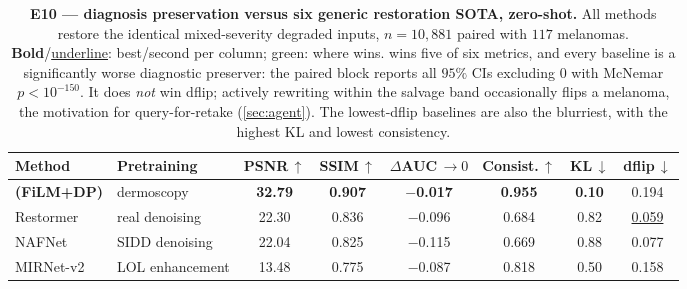 \begin{table}[!ht]
\centering
\caption{\textbf{E10 --- diagnosis preservation versus six generic restoration SOTA, zero-shot.}
All methods restore the identical mixed-severity degraded inputs, $n{=}10{,}881$ paired with $117$
melanomas. \textbf{Bold}/\underline{underline}: best/second per column; green: where \visienhance{}
wins. \visienhance{} wins five of six metrics, and every baseline is a significantly worse diagnostic
preserver: the paired block reports all $95\%$ CIs excluding $0$ with McNemar $p<10^{-150}$.
It does \emph{not} win dflip; actively rewriting within the salvage band occasionally flips a
melanoma, the motivation for query-for-retake (\cref{sec:agent}). The lowest-dflip baselines are also
the blurriest, with the highest KL and lowest consistency.}
\label{tab:e10}
\footnotesize
\setlength{\tabcolsep}{4.5pt}
\renewcommand{\arraystretch}{1.05}
\begin{tabular}{l l c c c c c c}
\toprule
Method & Pretraining & PSNR\,$\uparrow$ & SSIM\,$\uparrow$ & $\Delta$AUC\,$\to0$ & Consist.\,$\uparrow$ & KL\,$\downarrow$ & dflip\,$\downarrow$ \\
\midrule
\rowcolor{green!12}\textbf{\visienhance{} (FiLM+DP)} & dermoscopy
 & \cellcolor{green!18}\textbf{32.79}
 & \cellcolor{green!18}\textbf{0.907}
 & \cellcolor{green!18}\textbf{$-$0.017}
 & \cellcolor{green!18}\textbf{0.955}
 & \cellcolor{green!18}\textbf{0.10}
 & 0.194 \\
\midrule
Restormer \citep{zamir2022restormer}   & real denoising  & 22.30 & 0.836 & \cellcolor{red!16}$-$0.096 & 0.684 & 0.82 & \underline{0.059} \\
NAFNet \citep{chen2022simple}          & SIDD denoising  & 22.04 & 0.825 & \cellcolor{red!20}$-$0.115 & 0.669 & 0.88 & 0.077 \\
MIRNet-v2 \citep{zamir2022mirnetv2}    & LOL enhancement & 13.48 & 0.775 & \cellcolor{red!14}$-$0.087 & 0.818 & 0.50 & 0.158 \\

\end{tabular}
\end{table}
